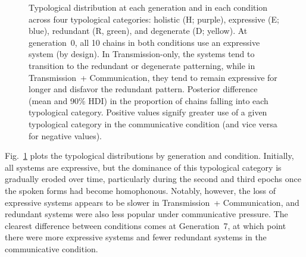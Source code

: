 \documentclass[doc,biblatex]{apa7}
\begin{document}
	\begin{figure}
	\vspace*{2pt}
	\caption{Typological distribution at each generation and in each condition across four typological categories: holistic (H; purple), expressive (E; blue), redundant (R, green), and degenerate (D; yellow). At generation~0, all 10 chains in both conditions use an expressive system (by design). In Transmission-only, the systems tend to transition to the redundant or degenerate patterning, while in Transmission~+ Communication, they tend to remain expressive for longer and disfavor the redundant pattern. Posterior difference (mean and 90\% HDI) in the proportion of chains falling into each typological category. Positive values signify greater use of a given typological category in the communicative condition (and vice versa for negative values).}
	\label{typ_dist_con}
	\end{figure}

Fig.~\ref{typ_dist_con} plots the typological distributions by generation and condition. Initially, all systems are expressive, but the dominance of this typological category is gradually eroded over time, particularly during the second and third epochs once the spoken forms had become homophonous. Notably, however, the loss of expressive systems appears to be slower in Transmission~+ Communication, and redundant systems were also less popular under communicative pressure. The clearest difference between conditions comes at Generation~7, at which point there were more expressive systems and fewer redundant systems in the communicative condition.
\end{document}
